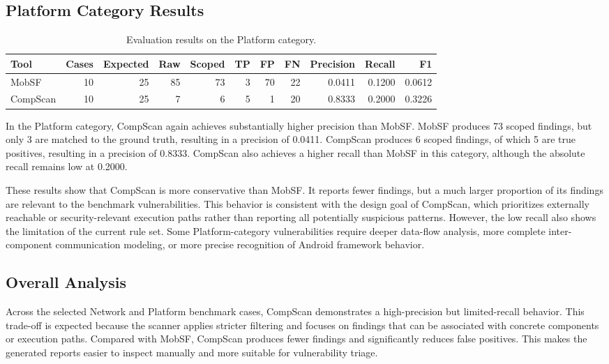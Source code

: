 \documentclass[sigconf, nonacm]{acmart}
\begin{document}
\subsection{Platform Category Results}

\begin{table}[t]
\centering
\scriptsize
\caption{Evaluation results on the Platform category.}
\label{tab:platform-results}
\begin{tabular}{lrrrrrrrrrr}
\toprule
Tool & Cases & Expected & Raw & Scoped & TP & FP & FN & Precision & Recall & F1 \\
\midrule
MobSF & 10 & 25 & 85 & 73 & 3 & 70 & 22 & 0.0411 & 0.1200 & 0.0612 \\
CompScan & 10 & 25 & 7 & 6 & 5 & 1 & 20 & 0.8333 & 0.2000 & 0.3226 \\
\bottomrule
\end{tabular}
\end{table}

In the Platform category, CompScan again achieves substantially higher precision than MobSF. MobSF produces 73 scoped findings, but only 3 are matched to the ground truth, resulting in a precision of 0.0411. CompScan produces 6 scoped findings, of which 5 are true positives, resulting in a precision of 0.8333. CompScan also achieves a higher recall than MobSF in this category, although the absolute recall remains low at 0.2000.

These results show that CompScan is more conservative than MobSF. It reports fewer findings, but a much larger proportion of its findings are relevant to the benchmark vulnerabilities. This behavior is consistent with the design goal of CompScan, which prioritizes externally reachable or security-relevant execution paths rather than reporting all potentially suspicious patterns. However, the low recall also shows the limitation of the current rule set. Some Platform-category vulnerabilities require deeper data-flow analysis, more complete inter-component communication modeling, or more precise recognition of Android framework behavior.

\subsection{Overall Analysis}

Across the selected Network and Platform benchmark cases, CompScan demonstrates a high-precision but limited-recall behavior. This trade-off is expected because the scanner applies stricter filtering and focuses on findings that can be associated with concrete components or execution paths. Compared with MobSF, CompScan produces fewer findings and significantly reduces false positives. This makes the generated reports easier to inspect manually and more suitable for vulnerability triage.
\end{document}
